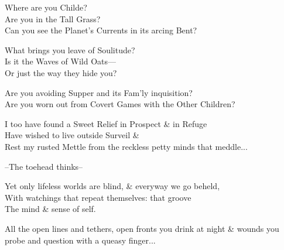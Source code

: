 

Where are you Childe? \\
Are you in the Tall Grass? \\
Can you see the Planet's Currents in its arcing Bent? 

What brings you leave of Soulitude? \\
Is it the Waves of Wild Oats— \\
Or just the way they hide you? 

Are you avoiding Supper and its Fam'ly inquisition? \\
Are you worn out from Covert Games with the Other Children?

I too have found a Sweet Relief in Prospect \& in Refuge \\
Have wished to live outside Surveil \& \\
Rest my rusted Mettle from the reckless petty minds that meddle...

\secdiv

--The toehead thinks--

Yet only lifeless worlds are blind, \& everyway we go beheld, \\
With watchings that repeat themselves: that groove \\
The mind \& sense of self. 


All the open lines and tethers,  open fronts you drink at night \& wounds you probe and question with a queasy finger...